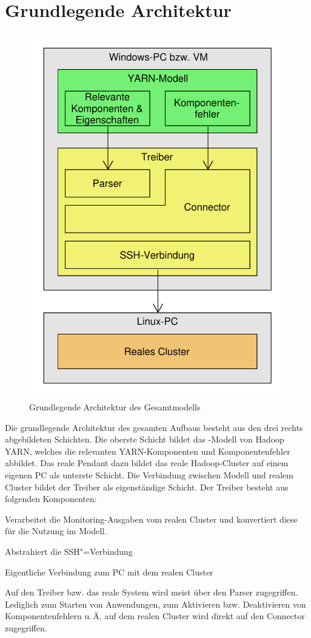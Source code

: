 \section{Grundlegende Architektur}\label{sec:architecture}

\begin{figure}
    \centering
    \includegraphics[width=0.5\columnwidth]{./images/modelArchitecture.pdf}
    \caption{Grundlegende Architektur des Gesamtmodells}
    \label{fig:modelArchitecture}
\end{figure}

Die grundlegende Architektur des gesamten Aufbaus besteht aus den drei rechts abgebildeten Schichten. Die oberste Schicht bildet das \sS-Modell von Hadoop YARN, welches die relevanten YARN-Komponenten und Komponentenfehler abbildet. Das reale Pendant dazu bildet das reale Hadoop-Cluster auf einem eigenen PC als unterste Schicht. Die Verbindung zwischen Modell und realem Cluster bildet der Treiber als eigenständige Schicht. Der Treiber besteht aus folgenden Komponenten:

\begin{description}[noitemsep]
    \item [Parser] Verarbeitet die Monitoring-Ausgaben vom realen Cluster und konvertiert diese für die Nutzung im Modell.
    \item [Connector] Abstrahiert die SSH"=Verbindung
    \item [SSH-Verbindung] Eigentliche Verbindung zum PC mit dem realen Cluster
\end{description}

Auf den Treiber bzw. das reale System wird meist über den Parser zugegriffen. Lediglich zum Starten von Anwendungen, zum Aktivieren bzw. Deaktivieren von Komponentenfehlern u.\,Ä. auf dem realen Cluster wird direkt auf den Connector zugegriffen.